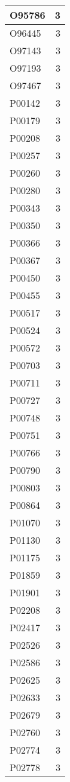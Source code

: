 \documentclass[
]{book}
\theoremstyle{definition}
\theoremstyle{definition}
\theoremstyle{definition}
\theoremstyle{definition}
\theoremstyle{remark}
\begin{document}
\begin{table}
\begin{tabular}{l|r}
\hline
O95786 & 3\\
\hline
O96445 & 3\\
\hline
O97143 & 3\\
\hline
O97193 & 3\\
\hline
O97467 & 3\\
\hline
P00142 & 3\\
\hline
P00179 & 3\\
\hline
P00208 & 3\\
\hline
P00257 & 3\\
\hline
P00260 & 3\\
\hline
P00280 & 3\\
\hline
P00343 & 3\\
\hline
P00350 & 3\\
\hline
P00366 & 3\\
\hline
P00367 & 3\\
\hline
P00450 & 3\\
\hline
P00455 & 3\\
\hline
P00517 & 3\\
\hline
P00524 & 3\\
\hline
P00572 & 3\\
\hline
P00703 & 3\\
\hline
P00711 & 3\\
\hline
P00727 & 3\\
\hline
P00748 & 3\\
\hline
P00751 & 3\\
\hline
P00766 & 3\\
\hline
P00790 & 3\\
\hline
P00803 & 3\\
\hline
P00864 & 3\\
\hline
P01070 & 3\\
\hline
P01130 & 3\\
\hline
P01175 & 3\\
\hline
P01859 & 3\\
\hline
P01901 & 3\\
\hline
P02208 & 3\\
\hline
P02417 & 3\\
\hline
P02526 & 3\\
\hline
P02586 & 3\\
\hline
P02625 & 3\\
\hline
P02633 & 3\\
\hline
P02679 & 3\\
\hline
P02760 & 3\\
\hline
P02774 & 3\\
\hline
P02778 & 3\\

\end{tabular}
\end{table}
\end{document}
